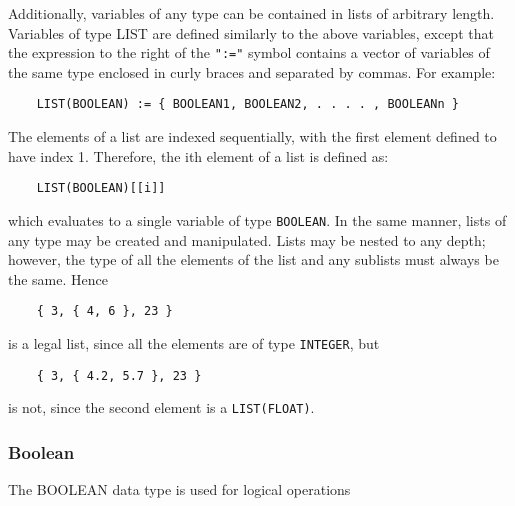\medskip

\noindent
Additionally, variables of any type can be contained in lists of arbitrary
length.
Variables of type LIST are defined similarly to the above variables,
except that the expression to the right of the {\tt ":="} symbol
contains a vector of variables of the same type enclosed in curly braces
and separated by commas.  For example:

\begin{verbatim}
	LIST(BOOLEAN) := { BOOLEAN1, BOOLEAN2, . . . . , BOOLEANn }
\end{verbatim}

The elements of a list are indexed sequentially, with the first element
defined to have index 1.  Therefore, the ith
element of a list is defined as:

\begin{verbatim}
	LIST(BOOLEAN)[[i]]
\end{verbatim}

\noindent which evaluates to a single variable of type \verb+BOOLEAN+.
In the same manner, lists of any type may be created and manipulated.
Lists may be nested to any depth; however, the type of all the elements
of the list and any sublists must always be the same.  Hence

\begin{verbatim}
	{ 3, { 4, 6 }, 23 }
\end{verbatim}

is a legal list, since all the elements are of type \verb+INTEGER+, but

\begin{verbatim}
	{ 3, { 4.2, 5.7 }, 23 }
\end{verbatim}

is not, since the second element is a \verb+LIST(FLOAT)+.

\subsubsection{Boolean}

The BOOLEAN data type is used for logical operations

